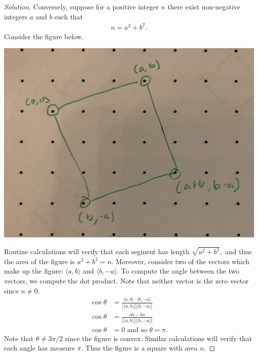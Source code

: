 \documentclass[12pt]{article}
\newenvironment{exercise}[2][Exercise]{\begin{trivlist}
        \item[\hskip \labelsep {\bfseries #1}\hskip \labelsep {\bfseries #2.}]}{\end{trivlist}}
\newenvironment{solution}
        {\begin{proof}[Solution]}
                    {\end{proof}}
\begin{document}
\begin{exercise}{10}
\begin{solution}
        Conversely, suppose for a positive integer \( n \) there exist non-negative integers \( a \) and \( b \) such that
        \begin{align*}
            n = a^{2} + b^{2} .
        \end{align*}
        Consider the figure below.
        \begin{center}
        \includegraphics[width=.5\linewidth]{10}
        \end{center}
        Routine calculations will verify that each segment has length \( \sqrt{a^{2} + b^{2}} , \) and thus the area of the figure is \( a^{2} + b^{2} = n. \) Moreover, consider two of the vectors which make up the figure: \( \langle a,b \rangle \) and \( \langle b,-a \rangle . \) To compute the angle between the two vectors, we compute the dot product. Note that neither vector is the zero vector since \( n \neq 0. \)
        \begin{align*}
            \cos\theta &= \frac{\langle a,b \rangle \cdot \langle b,-a \rangle}{\left| \langle a,b \rangle \right| \left| \langle b,-a \rangle \right| } \\
            \cos\theta &= \frac{ab - ba}{\left| \langle a,b \rangle \right| \left| \langle b,-a \rangle \right| } \\
            \cos\theta &= 0 \text{ and so }\theta = \pi.
        \end{align*}
        Note that \( \theta \neq 3\pi/2 \) since the figure is convex. Similar calculations will verify that each angle has measure \( \pi. \) Thus the figure is a square with area \( n. \)
    \end{solution}
\end{exercise}
\end{document}
